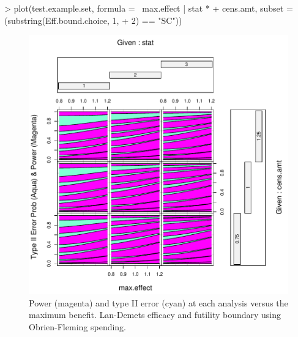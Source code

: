 \documentclass{article}
\begin{document}
\begin{Schunk}
\begin{Sinput}
> plot(test.example.set, formula = ~max.effect | stat * 
+     cens.amt, subset = (substring(Eff.bound.choice, 1, 
+     2) == "SC"))
\end{Sinput}
\end{Schunk}

\begin{figure}
\begin{center}
\includegraphics{cpd-PwrGSD-vignette-1-fig1-LanDemets}
\end{center}
\caption{Power (magenta) and type II error (cyan) at each analysis versus the
  maximum benefit. Lan-Demets efficacy and futility boundary using
  Obrien-Fleming spending.}
\label{fig:LanDemets}
\end{figure}
\end{document}
